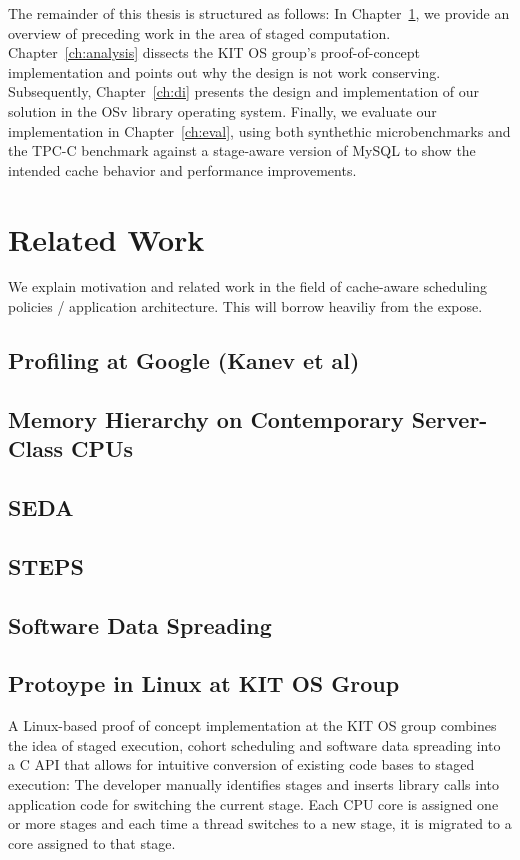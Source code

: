\documentclass[12pt,a4paper]{book}
\begin{document}
The remainder of this thesis is structured as follows:
In Chapter~\ref{ch:relwork}, we provide an overview of preceding work in the area of staged computation.
Chapter~\ref{ch:analysis} dissects the KIT OS group's proof-of-concept implementation and points out why the design is not work conserving.
Subsequently, Chapter~\ref{ch:di} presents the design and implementation of our solution in the OSv library operating system.
Finally, we evaluate our implementation in Chapter~\ref{ch:eval}, using both synthethic microbenchmarks and the TPC-C benchmark against a stage-aware version of MySQL to show the intended cache behavior and performance improvements.

\chapter{Related Work}\label{ch:relwork}
We explain motivation and related work in the field of cache-aware scheduling policies / application architecture.
This will borrow heaviliy from the expose.

\section{Profiling at Google (Kanev et al)}
\section{Memory Hierarchy on Contemporary Server-Class CPUs}
\section{SEDA}
\section{STEPS}
\section{Software Data Spreading}
\section{Protoype in Linux at KIT OS Group}
A Linux-based proof of concept implementation at the KIT OS group combines the idea of staged execution, cohort
scheduling and software data spreading into a C API that allows for intuitive conversion of existing code bases to
staged execution:
The developer manually identifies stages and inserts library calls into application code for switching the current stage.
Each CPU core is assigned one or more stages and each time a thread switches to a new stage, it is migrated to a core
assigned to that stage.
\end{document}
